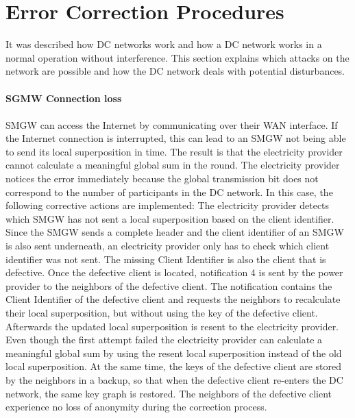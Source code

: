 \section{Error Correction Procedures}
It was described how DC networks work and how a DC network works in a normal operation without interference. This section explains which attacks on the network are possible and how the DC network deals with potential disturbances.
\\
\\
\textbf{SGMW Connection loss}
\\
\\
SMGW can access the Internet by communicating over their WAN interface. If the Internet connection is interrupted, this can lead to an SMGW not being able to send its local superposition in time. The result is that the electricity provider cannot calculate a meaningful global sum in the round. The electricity provider notices the error immediately because the global transmission bit does not correspond to the number of participants in the DC network. In this case, the following corrective actions are implemented: %
The electricity provider detects which SMGW has not sent a local superposition based on the client identifier. Since the SMGW sends a complete header and the client identifier of an SMGW is also sent underneath, an electricity provider only has to check which client identifier was not sent. The missing Client Identifier is also the client that is defective. Once the defective client is located, notification 4 is sent by the power provider to the neighbors of the defective client. The notification contains the Client Identifier of the defective client and requests the neighbors to recalculate their local superposition, but without using the key of the defective client. Afterwards the updated local superposition is resent to the electricity provider. Even though the first attempt failed the electricity provider can calculate a meaningful global sum by using the resent local superposition instead of the old local superposition. At the same time, the keys of the defective client are stored by the neighbors in a backup, so that when the defective client re-enters the DC network, the same key graph is restored. The neighbors of the defective client experience no loss of anonymity during the correction process.\\%
